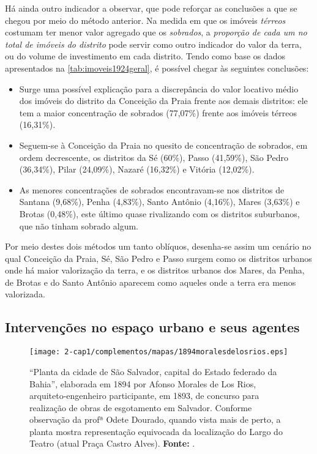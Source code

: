 Há ainda outro indicador a observar, que pode reforçar as conclusões a que se chegou por meio do método anterior. Na medida em que os imóveis \textit{térreos} costumam ter menor valor agregado que os \textit{sobrados}, a \textit{proporção de cada um no total de imóveis do distrito} pode servir como outro indicador do valor da terra, ou do volume de investimento em cada distrito. Tendo como base os dados apresentados na \autoref{tab:imoveis1924geral}, é possível chegar às seguintes conclusões:

\begin{itemize}
\item Surge uma possível explicação para a discrepância do valor locativo médio dos imóveis do distrito da Conceição da Praia frente aos demais distritos: ele tem a maior concentração de sobrados (77,07\%) frente aos imóveis térreos (16,31\%).
\item Seguem-se à Conceição da Praia no quesito de concentração de sobrados, em ordem decrescente, os distritos da Sé (60\%), Passo (41,59\%), São Pedro (36,34\%), Pilar (24,09\%), Nazaré (16,32\%) e Vitória (12,02\%).
\item As menores concentrações de sobrados encontravam-se nos distritos de Santana (9,68\%), Penha (4,83\%), Santo Antônio (4,16\%), Mares (3,63\%) e Brotas (0,48\%), este último quase rivalizando com os distritos suburbanos, que não tinham sobrado algum.
\end{itemize}

Por meio destes dois métodos um tanto oblíquos, desenha-se assim um cenário no qual Conceição da Praia, Sé, São Pedro e Passo surgem como os distritos urbanos onde há maior valorização da terra, e os distritos urbanos dos Mares, da Penha, de Brotas e do Santo Antônio aparecem como aqueles onde a terra era menos valorizada.

\subsection{Intervenções no espaço urbano e seus agentes}\label{subsec:1.4.3}

\begin{figure}[!htp]
\centering
\texttt{[image: 2-cap1/complementos/mapas/1894moralesdelosrios.eps]} 
\caption{``Planta da cidade de São Salvador, capital do Estado federado da Bahia'', elaborada em 1894 por Afonso Morales de Los Rios, arquiteto-engenheiro participante, em 1893, de concurso para realização de obras de esgotamento em Salvador. Conforme observação da profª Odete Dourado, quando vista mais de perto, a planta mostra representação equivocada da localização do Largo do Teatro (atual Praça Castro Alves). \textbf{Fonte:} .}
\end{figure}

